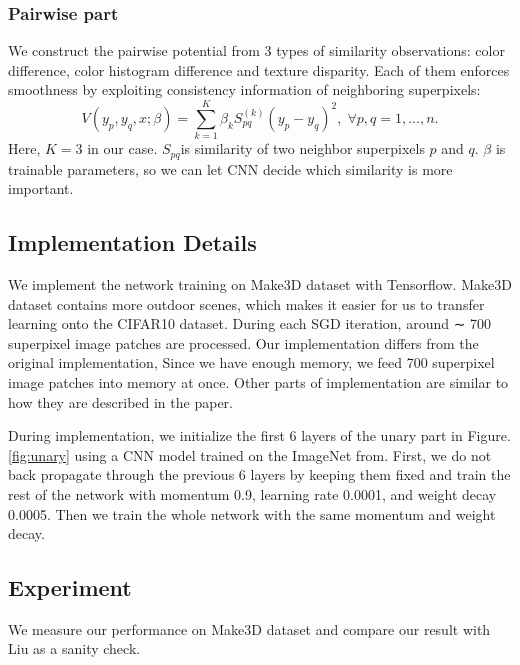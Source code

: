 \documentclass[10pt,twocolumn,letterpaper]{article}
\begin{document}
\subsubsection{Pairwise part}
We construct the pairwise potential from 3 types of similarity observations: 
color difference, color histogram difference and texture 
disparity\cite{ojala1994performance}. Each of them enforces smoothness by 
exploiting consistency information of neighboring superpixels:
\begin{equation}
 \label{eq:pairwise}
V(y_{p}, y_{q}, x; \beta) = \sum_{k=1}^K \beta_k S_{pq}^{(k)}(y_p - y_q)^2, 
\;\forall p,q=1,...,n.
\end{equation}
Here, $K=3$ in our case. $S_{pq}$is similarity of two neighbor superpixels $p$ 
and $q$. $\beta$ is trainable parameters, so we can let CNN decide which 
similarity is more important. 

\subsection{Implementation Details}
We implement the network training on Make3D\cite{saxena2005learning} dataset 
with Tensorflow\cite{tensorflow2015-whitepaper}. Make3D dataset contains 
more outdoor scenes, which makes it easier for us to transfer learning onto the
CIFAR10 dataset. During each SGD iteration, 
around ∼ 700 superpixel image patches are processed. Our implementation differs from the 
original implementation\cite{liu2015deep}, Since we have enough memory, we feed 
700 superpixel image patches into memory at once. Other parts of implementation are similar to how they are described in the paper.

During implementation, we initialize the first 6 layers of the unary part in 
Figure.\ref{fig:unary} using a CNN model trained on the ImageNet 
from\cite{chatfield2014return}. First, we do not back propagate through the 
previous 6 layers by keeping them fixed and train the rest of the network
with momentum 0.9, learning rate 0.0001, and weight decay 
0.0005. Then we train the whole network with the same momentum and weight decay.

\subsection{Experiment}
We measure our performance on Make3D dataset and compare our result with Liu 
\etal \cite{liu2015deep} as a sanity check. 
\end{document}

